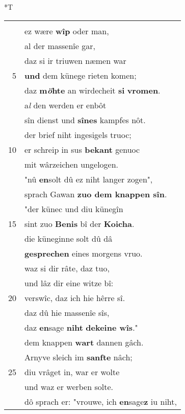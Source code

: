 \documentclass[8pt,a4paper,notitlepage]{article}
\begin{document}
\begin{table}[ht]
\begin{minipage}[t]{0.5\linewidth}
\small
\begin{center}*T
\end{center}
\begin{tabular}{rl}
 & \textbf{\begin{large}D\end{large}ô} enbôt \textbf{ouch} hêr Gawan,\\ 
 & ez wære \textbf{wîp} oder man,\\ 
 & al der massenîe gar,\\ 
 & daz si ir triuwen næmen war\\ 
5 & \textbf{und} dem künege rieten komen;\\ 
 & daz \textbf{m\textit{ö}hte} an wirdecheit \textbf{si} \textbf{vromen}.\\ 
 & a\textit{l} den werden er enbôt\\ 
 & sîn dienst und \textbf{sînes} kampfes nôt.\\ 
 & der brief niht ingesigels truoc;\\ 
10 & er schreip in sus \textbf{bekant} genuoc\\ 
 & mit wârzeichen ungelogen.\\ 
 & "nû \textbf{en}solt dû ez niht langer zogen",\\ 
 & sprach Gawan \textbf{zuo dem knappen sîn}.\\ 
 & "der künec und diu künegîn\\ 
15 & sint zuo \textbf{Benis} bî der \textbf{Koicha}.\\ 
 & die küneginne solt dû dâ\\ 
 & \textbf{gesprechen} eines morgens vruo.\\ 
 & waz si dir râte, daz tuo,\\ 
 & und lâz dir eine witze bî:\\ 
20 & verswîc, daz ich hie hêrre sî.\\ 
 & daz dû hie massenîe sîs,\\ 
 & daz \textbf{en}sage \textbf{niht} \textbf{dekeine wîs}."\\ 
 & dem knappen \textbf{wart} dannen gâch.\\ 
 & Arnyve sleich im \textbf{sanfte} nâch;\\ 
25 & diu vrâget in, war er wolte\\ 
 & und waz er werben solte.\\ 
 & dô sprach er: "vrouwe, ich \textbf{en}sage\textbf{z} iu niht,\\ 

\end{tabular}
\end{minipage}
\end{table}
\end{document}

